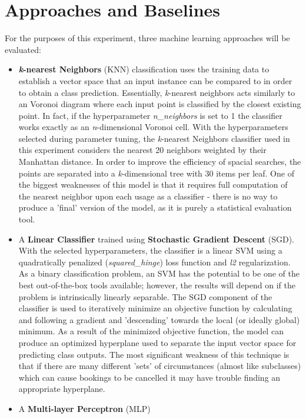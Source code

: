\documentclass[10pt,conference]{IEEEtran}
\begin{document}
\section{Approaches and Baselines}
  For the purposes of this experiment, three machine learning approaches will be evaluated:
  \begin{itemize}
    \item \textbf{\emph{k}-nearest Neighbors} (KNN) classification uses the training data to establish a vector space that an input instance can be compared to in order to obtain a class prediction. Essentially, \emph{k}-nearest neighbors acts similarly to an Voronoi diagram where each input point is classified by the closest existing point. In fact, if the hyperparameter \emph{n\_neighbors} is set to 1 the classifier works exactly as an \emph{n}-dimensional Voronoi cell. With the hyperparameters selected during parameter tuning, the \emph{k}-nearest Neighbors classifier used in this experiment considers the nearest 20 neighbors weighted by their Manhattan distance. In order to improve the efficiency of spacial searches, the points are separated into a \emph{k}-dimensional tree with 30 items per leaf. One of the biggest weaknesses of this model is that it requires full computation of the nearest neighbor upon each usage as a classifier - there is no way to produce a 'final' version of the model, as it is purely a statistical evaluation tool.
    \item A \textbf{Linear Classifier} trained using \textbf{Stochastic Gradient Descent} (SGD). With the selected hyperparameters, the classifier is a linear SVM using a quadratically penalized (\emph{squared_hinge}) loss function and \emph{l2} regularization. As a binary classification problem, an SVM has the potential to be one of the best out-of-the-box tools available; however, the results will depend on if the problem is intrinsically linearly separable. The SGD component of the classifier is used to iteratively minimize an objective function by calculating and following a gradient and 'descending' towards the local (or ideally global) minimum. As a result of the minimized objective function, the model can produce an optimized hyperplane used to separate the input vector space for predicting class outputs. The most significant weakness of this technique is that if there are many different 'sets' of circumstances (almost like subclasses) which can cause bookings to be cancelled it may have trouble finding an appropriate hyperplane.
    \item A \textbf{Multi-layer Perceptron} (MLP)
  \end{itemize}
\end{document}
